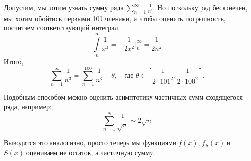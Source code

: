 \documentclass[a4paper, 12pt]{article}
\begin{document}
\begin{Examples}
Допустим, мы хотим узнать сумму ряда $\sum\limits_{n=1}^{\infty}\frac{1}{n^3}$. Но поскольку ряд бесконечен, мы хотим обойтись первыми 100 членами, а чтобы оценить погрешность, посчитаем соответствующий интеграл.
$$
\int\limits_{n}^\infty \frac{1}{x^3} = -\frac{1}{2x^2} \Big|^\infty_{n} = \frac{1}{2n^2}
$$
Итого,
$$
\sum\limits_{n=1}^{\infty}\frac{1}{n^3} = \sum\limits_{n=1}^{100}\frac{1}{n^3} + \theta, \quad \text{где } \theta \in \left[\frac{1}{2\cdot101^2}, \frac{1}{2\cdot 100^2}\right].
$$

\end{Examples}

Подобным способом можно оценить асимптотику частичных сумм сходящегося ряда, например:
$$
\sum_{n=1}^{N} \frac{1}{\sqrt{n}} \sim 2\sqrt{n}
$$

Выводится это аналогично, просто теперь мы функциями $f(x)$, $f_S(x)$ и $S(x)$ оцениваем не остаток, а частичную сумму.
\end{document}
